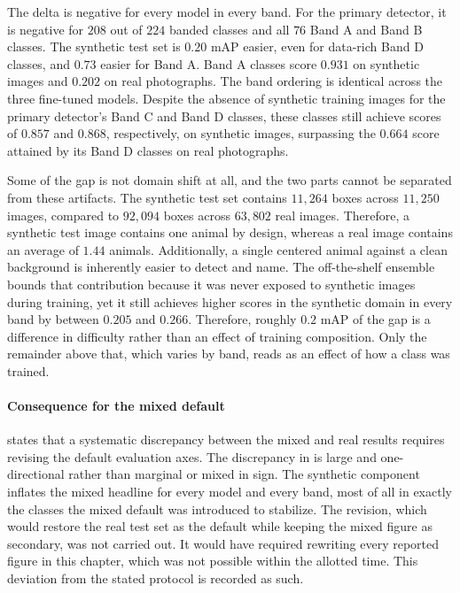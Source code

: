 The delta is negative for every model in every band. For the primary detector, it is negative for $208$ out of $224$ banded classes and all $76$ Band A and Band B classes.  %
The synthetic test set is $0.20$ mAP easier, even for data-rich Band D classes, and $0.73$ easier for Band A. Band A classes score $0.931$ on synthetic images and $0.202$ on real photographs. The band ordering is identical across the three fine-tuned models. Despite the absence of synthetic training images for the primary detector's Band C and Band D classes, these classes still achieve scores of $0.857$ and $0.868$, respectively, on synthetic images, surpassing the $0.664$ score attained by its Band D classes on real photographs.

Some of the gap is not domain shift at all, and the two parts cannot be separated from these artifacts. The synthetic test set contains $11{,}264$ boxes across $11{,}250$ images, compared to $92{,}094$ boxes across $63{,}802$ real images. Therefore, a synthetic test image contains one animal by design, whereas a real image contains an average of $1.44$ animals. Additionally, a single centered animal against a clean background is inherently easier to detect and name. The off-the-shelf ensemble bounds that contribution because it was never exposed to synthetic images during training, yet it still achieves higher scores in the synthetic domain in every band by between $0.205$ and $0.266$. Therefore, roughly $0.2$ mAP of the gap is a difference in difficulty rather than an effect of training composition. Only the remainder above that, which varies by band, reads as an effect of how a class was trained.

\paragraph{Consequence for the mixed default}
 states that a systematic discrepancy between the mixed and real results requires revising the default evaluation axes. The discrepancy in  is large and one-directional rather than marginal or mixed in sign. The synthetic component inflates the mixed headline for every model and every band, most of all in exactly the classes the mixed default was introduced to stabilize. The revision, which would restore the real test set as the default while keeping the mixed figure as secondary, was not carried out. It would have required rewriting every reported figure in this chapter, which was not possible within the allotted time. This deviation from the stated protocol is recorded as such.

